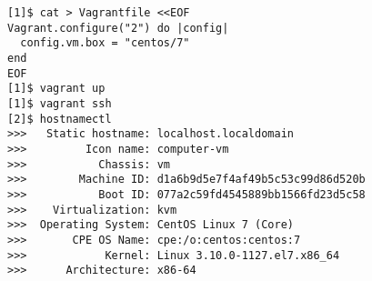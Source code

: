 \begin{lstfloat}
\begin{lstlisting}[style=mybashstyle,
caption={Nastavení prostředí pomocí Vagrant},
label={sample:vm}
]
[1]$ cat > Vagrantfile <<EOF
Vagrant.configure("2") do |config|
  config.vm.box = "centos/7"
end
EOF
[1]$ vagrant up
[1]$ vagrant ssh
[2]$ hostnamectl
>>>   Static hostname: localhost.localdomain
>>>         Icon name: computer-vm
>>>           Chassis: vm
>>>        Machine ID: d1a6b9d5e7f4af49b5c53c99d86d520b
>>>           Boot ID: 077a2c59fd4545889bb1566fd23d5c58
>>>    Virtualization: kvm
>>>  Operating System: CentOS Linux 7 (Core)
>>>       CPE OS Name: cpe:/o:centos:centos:7
>>>            Kernel: Linux 3.10.0-1127.el7.x86_64
>>>      Architecture: x86-64
\end{lstlisting}
\end{lstfloat}